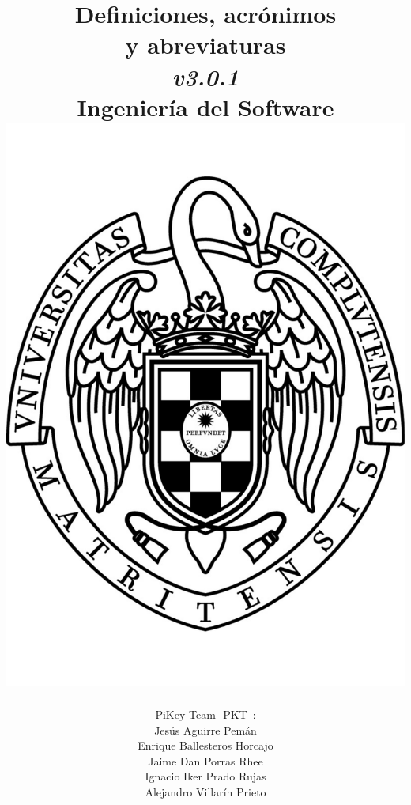 \documentclass[spanish,a4paper,11pt, twoside]{report}	%
\newcommand*{\PKT}{\hbox{P}\kern-2.5pt\lower3.5pt\hbox{\small{K}}\kern-2.8pt\hbox{T}\kern-2pt}	%
\begin{document}
\title{\textbf{\huge{Definiciones, acrónimos \\ 
	y abreviaturas}} \\ 
	\textit{v3.0.1} \\	\vspace{0.1cm}
	\Large{Ingeniería del Software} \\
	\includegraphics[scale=0.3]{ucm.pdf}}
\author{{\Large{PiKey Team-}} \PKT \ : \vspace{0.2cm} \\
	Jesús Aguirre Pemán \\
	 Enrique Ballesteros Horcajo \\
	 Jaime Dan Porras Rhee \\
	 Ignacio Iker Prado Rujas \\
	 Alejandro Villarín Prieto }
\date{\Today}
\maketitle
\end{document}
